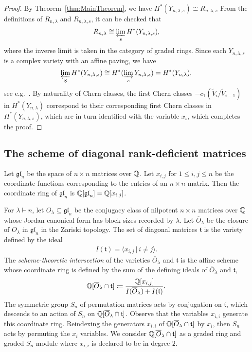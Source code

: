 \documentclass[12pt]{amsart}
\newcommand{\st}{\,|\,}
\newcommand{\la}{\lambda}
\newcommand{\fgl}{\mathfrak{gl}}
\newcommand{\ft}{\mathfrak{t}}
\begin{document}
\begin{proof}
By Theorem~\ref{thm:MainTheorem}, we have $H^*(Y_{n,\lambda,s})\cong R_{n,\la,s}$ From the definitions of $R_{n,\la}$ and $R_{n,\la,s}$, it can be checked that
\begin{align}
R_{n,\la} \cong \varprojlim_s H^*(Y_{n,\la,s}),
\end{align}
where the inverse limit is taken in the category of graded rings. Since each $Y_{n,\la,s}$ is a complex variety with an affine paving, we have
\begin{align}
  \varprojlim_S H^*(Y_{n,\la,s}) \cong H^*(\varinjlim_s Y_{n,\la,s}) = H^*(Y_{n,\la}),
\end{align}
see e.g.~\cite[Lemma 7.2]{Pawlowski-Rhoades}. By naturality of Chern classes, the first Chern classes $-c_1(\widetilde V_i/\widetilde V_{i-1})$ in $H^*(Y_{n,\la})$ correspond to their corresponding first Chern classes in $H^*(Y_{n,\la,s})$, which are in turn identified with the variable $x_i$, which completes the proof.
\end{proof}

\subsection{The scheme of diagonal rank-deficient matrices}

Let $\fgl_n$ be the space of $n\times n$ matrices over $\mathbb{Q}$. Let $x_{i,j}$  for $1\leq i,j \leq n$ be the coordinate functions corresponding to the entries of an $n\times n$ matrix. Then the coordinate ring of $\fgl_n$ is $\bQ[\fgl_n] = \bQ[x_{i,j}]$.  

For $\la\vdash n$, let $O_\la\subseteq \fgl_n$ be the conjugacy class of nilpotent $n\times n$ matrices over $\mathbb{Q}$ whose Jordan canonical form has block sizes recorded by $\la$. Let $\overline{O}_\la$ be the closure of $O_\la$ in $\fgl_n$ in the Zariski topology. The set of diagonal matrices $\ft$ is the variety defined by the ideal
\begin{align}
I(\ft) = \langle x_{i,j} \st i\neq j\rangle.
\end{align}
The \emph{scheme-theoretic intersection} of the varieties $\overline{O}_\la$ and $\ft$ is the affine scheme whose coordinate ring is defined by the sum of the defining ideals of $\overline{O}_\la$ and $\ft$,
\begin{align}\label{eq:CoordinateRing}
\bQ[\overline{O}_\la \cap \ft] \coloneqq \frac{\bQ[x_{i,j}]}{I(\overline{O}_\la) + I(\ft)}.
\end{align}
The symmetric group $S_n$ of permutation matrices acts by conjugation on $\ft$, which descends to an action of $S_n$ on $\bQ[\overline{O}_\la\cap \ft]$. Observe that the variables $x_{i,i}$ generate this coordinate ring. Reindexing the generators $x_{i,i}$ of $\bQ[\overline{O}_\la \cap \ft]$ by $x_i$, then $S_n$ acts by permuting the $x_i$ variables. We consider $\bQ[\overline{O}_\la\cap \ft]$ as a graded ring and graded $S_n$-module where $x_{i,i}$ is declared to be in degree $2$.
\end{document}
